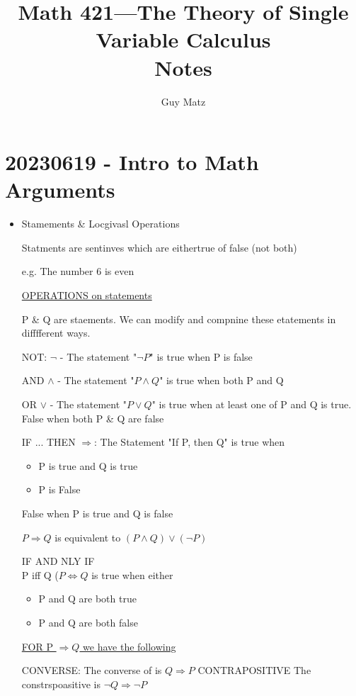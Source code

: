 \documentclass{report}
\title{
  \Huge{Math 421---The Theory of Single Variable Calculus}
  \\
  Notes
}
\author{\huge{Guy Matz}}
\date{}
\begin{document}
\section{20230619 - Intro to Math Arguments}%
\begin{itemize}
        \item Stamements & Locgivasl Operations

          Statments are sentinves which are eithertrue of false (not both)

          e.g. The number 6 is even

          \underline{OPERATIONS on statements}

          P & Q are staements.  We can modify and compnine these etatements in
          difffferent ways.

          NOT: $\neg$ - The statement "$\neg P$" is true when P is false

          AND $\wedge$ - The statement "$P \wedge Q $" is true when both P and Q

          OR $\vee$ - The statement "$P \vee Q $" is true when at least one of
          P and Q is true.  False when both P \& Q are false

          IF ... THEN $\Longrightarrow $: The Statement "If P, then Q" is true when
          \begin{itemize}
            \item P is true and Q is true
            \item P is False
          \end{itemize}

          False when P is true and Q is false

          $P \Longrightarrow Q$ is equivalent to $(P \wedge Q) \vee (\neg P)$

          IF AND NLY IF\\
          P iff Q ($P \Leftrightarrow Q$ is true when either
         \begin{itemize}
            \item P and Q are both true
            \item P and Q are both false
          \end{itemize}

          \underline{FOR P $\Longrightarrow Q$ we have the following}

          CONVERSE: The converse of is $Q \Longrightarrow P$
          CONTRAPOSITIVE The constrspoasitive is $\neg Q \Longrightarrow \neg P$


\end{itemize}
\end{document}
